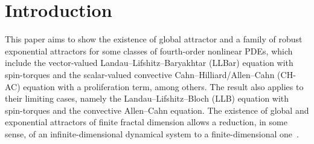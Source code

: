 \documentclass[11pt, reqno]{amsart}
\theoremstyle{definition}
\numberwithin{equation}{section}
\begin{document}
\section{Introduction}
This paper aims to show the existence of global attractor and a family of robust exponential attractors for some classes of fourth-order nonlinear PDEs, which include the vector-valued Landau--Lifshitz--Baryakhtar (LLBar) equation with spin-torques and the scalar-valued convective Cahn--Hilliard/Allen--Cahn (CH-AC) equation with a proliferation term, among others. The result also applies to their limiting cases, namely the Landau--Lifshitz--Bloch (LLB) equation with spin-torques and the convective Allen--Cahn equation. The existence of global and exponential attractors of finite fractal dimension allows a reduction, in some sense, of an infinite-dimensional dynamical system to a finite-dimensional one~\cite{Rob01}.
\end{document}
